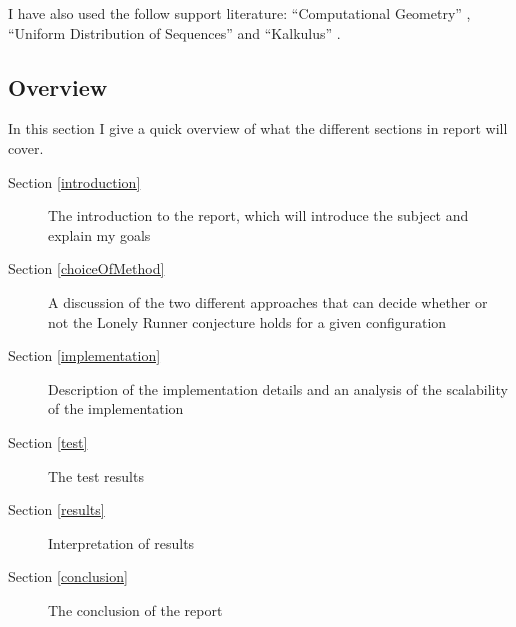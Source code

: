 I have also used the follow support literature:
``Computational Geometry'' \cite{citeulike:3347056}, ``Uniform Distribution of Sequences'' \cite{uniform} and ``Kalkulus'' \cite{kalkulus}.

\subsection{Overview}

In this section I give a quick overview of what the different sections in report will cover.
\begin{description}
\item[Section \ref{introduction}] The introduction to the report, which will introduce the subject and explain my goals
\item[Section \ref{choiceOfMethod}] A discussion of the two different approaches that can decide whether or not the Lonely Runner conjecture holds for a given configuration
\item[Section \ref{implementation}] Description of the implementation details and an analysis of the scalability of the implementation
\item[Section \ref{test}] The test results
\item[Section \ref{results}] Interpretation of results
\item[Section \ref{conclusion}] The conclusion of the report  
\end{description}
